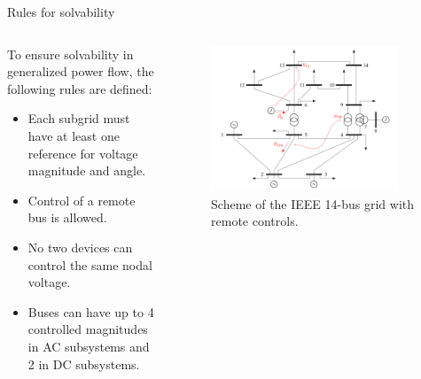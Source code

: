 \begin{frame}{Rules for solvability}
    \begin{columns}
        \begin{column}{0.5\textwidth}
            To ensure solvability in generalized power flow, the following rules are defined:
            \begin{itemize}
                \item Each subgrid must have at least one reference for voltage magnitude and angle.
                \item Control of a remote bus is allowed.
                \item No two devices can control the same nodal voltage.
                \item Buses can have up to 4 controlled magnitudes in AC subsystems and 2 in DC subsystems.
            \end{itemize}
        \end{column}
        
        \begin{column}{0.5\textwidth}
            \begin{figure}[H]
                \centering
                \includegraphics[width=0.9\textwidth]{chapter5pics/remote.png}
                \caption{Scheme of the IEEE 14-bus grid with remote controls.}
                \label{fig:simple6bus}
            \end{figure}
        \end{column}
    \end{columns}
\end{frame}



